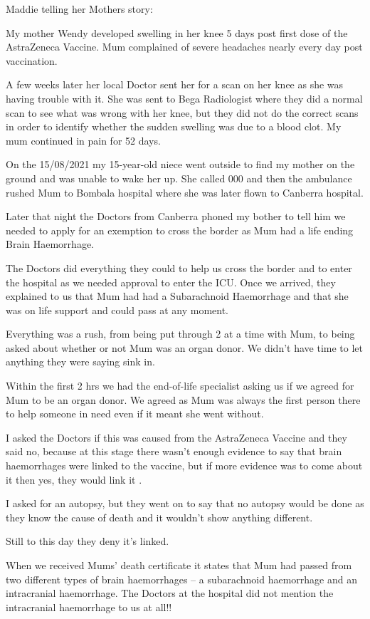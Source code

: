 Maddie telling her Mothers story:

My mother Wendy developed swelling in her knee 5 days post first dose of the
AstraZeneca Vaccine. Mum complained of severe headaches nearly every day post
vaccination.

A few weeks later her local Doctor sent her for a scan on her knee as she was
having trouble with it. She was sent to Bega Radiologist where they did a normal
scan to see what was wrong with her knee, but they did not do the correct scans
in order to identify whether the sudden swelling was due to a blood clot. My mum
continued in pain for 52 days.

On the 15/08/2021 my 15-year-old niece went outside to find my mother on the
ground and was unable to wake her up. She called 000 and then the ambulance
rushed Mum to Bombala hospital where she was later flown to Canberra hospital.

Later that night the Doctors from Canberra phoned my bother to tell him we
needed to apply for an exemption to cross the border as Mum had a life ending
Brain Haemorrhage.

The Doctors did everything they could to help us cross the border and to enter
the hospital as we needed approval to enter the ICU. Once we arrived, they
explained to us that Mum had had a Subarachnoid Haemorrhage and that she was on
life support and could pass at any moment.

Everything was a rush, from being put through 2 at a time with Mum, to being
asked about whether or not Mum was an organ donor. We didn’t have time to let
anything they were saying sink in.

Within the first 2 hrs we had the end-of-life specialist asking us if we agreed
for Mum to be an organ donor. We agreed as Mum was always the first person there
to help someone in need even if it meant she went without.

I asked the Doctors if this was caused from the AstraZeneca Vaccine and they
said no, because at this stage there wasn’t enough evidence to say that brain
haemorrhages were linked to the vaccine, but if more evidence was to come about
it then yes, they would link it .

I asked for an autopsy, but they went on to say that no autopsy would be done as
they know the cause of death and it wouldn’t show anything different.

Still to this day they deny it’s linked.

When we received Mums’ death certificate it states that Mum had passed from two
different types of brain haemorrhages – a subarachnoid haemorrhage and an
intracranial haemorrhage. The Doctors at the hospital did not mention the
intracranial haemorrhage to us at all!!

